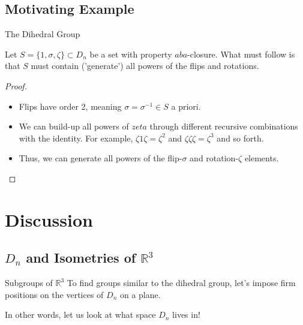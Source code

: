 \documentclass{beamer}
\begin{document}
\subsection{Motivating Example}

\begin{frame}{The Dihedral Group \hfill {}}
  \begin{example}
    Let $S = \{1, \sigma, \zeta\} \subset D_n$ be a set with property $aba$-closure. What must follow is that $S$ must contain ('generate') all powers of the flips and rotations.
  \end{example}

  \pause
  \begin{proof}
    \begin{itemize}
      \pause
      \item Flips have order 2, meaning $\sigma = \sigma^{-1} \in S$ a priori.
      \pause
      \item We can \alert{build-up} all powers of $zeta$ through different recursive combinations with the identity.\newline 
      For example, $\zeta 1 \zeta = \zeta^2$ and $\zeta \zeta \zeta = \zeta^3$ and so forth.
      \item Thus, we can generate all powers of the flip-$\sigma$ and rotation-$\zeta$ elements.
    \end{itemize}
  \end{proof}
\end{frame}

\section{Discussion}

\subsection{\texorpdfstring{$D_n$}{Dn} and Isometries of \texorpdfstring{$\mathbb{R}^3$}{R3}}
\begin{frame}{Subgroups of $\mathbb{R}^3$ \hfill {}}
  To find groups similar to the dihedral group, let's impose firm positions on the vertices of $D_n$ on a plane.\newline

  \pause
  In other words, let us look at what \alert{space} $D_n$ lives in!

\end{frame}
\end{document}
